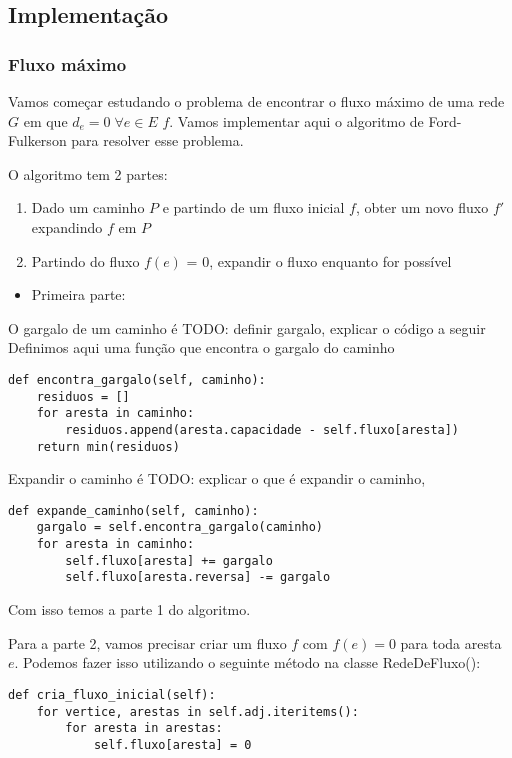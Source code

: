 \documentclass[11pt]{article}
\begin{document}
\subsection{Implementação}
\label{sec-3-3}

\subsubsection{Fluxo máximo}
\label{sec-3-3-1}

Vamos começar estudando o problema de encontrar o fluxo máximo de uma
rede $G$ em que $d_e = 0 \; \forall e \in E$ $f$. Vamos implementar aqui o
algoritmo de Ford-Fulkerson para resolver esse problema.

O algoritmo tem 2 partes:

\begin{enumerate}
\item Dado um caminho $P$ e partindo de um fluxo inicial $f$, obter um
novo fluxo $f'$ expandindo $f$ em $P$
\item Partindo do fluxo $f(e)$ = 0, expandir o fluxo enquanto for possível
\end{enumerate}


\begin{itemize}
\item Primeira parte:
\end{itemize}

O gargalo de um caminho é TODO: definir gargalo, explicar o código a seguir
Definimos aqui uma função que encontra o gargalo do caminho
\begin{verbatim}
def encontra_gargalo(self, caminho):
    residuos = []
    for aresta in caminho:
        residuos.append(aresta.capacidade - self.fluxo[aresta])
    return min(residuos)
\end{verbatim}

Expandir o caminho é TODO: explicar o que é expandir o caminho,
\begin{verbatim}
def expande_caminho(self, caminho):
    gargalo = self.encontra_gargalo(caminho)
    for aresta in caminho:
        self.fluxo[aresta] += gargalo
        self.fluxo[aresta.reversa] -= gargalo
\end{verbatim}

Com isso temos a parte 1 do algoritmo.

Para a parte 2, vamos precisar criar um fluxo $f$ com $f(e) = 0$ para
toda aresta $e$. Podemos fazer isso utilizando o seguinte método na
classe RedeDeFluxo():
\begin{verbatim}
def cria_fluxo_inicial(self):
    for vertice, arestas in self.adj.iteritems():
        for aresta in arestas:
            self.fluxo[aresta] = 0
\end{verbatim}
\end{document}
